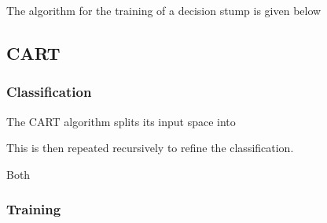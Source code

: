 The algorithm for the training of a decision stump is given below

\subsection{CART}

\subsubsection{Classification}

The CART algorithm splits its input space into 


  This is then repeated recursively to refine
the classification.

Both 

\subsubsection{Training}







